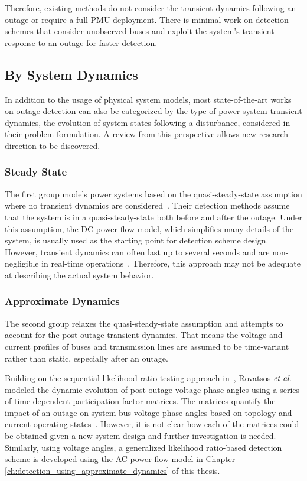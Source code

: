 Therefore, existing methods do not consider the transient dynamics following an outage or require a full PMU deployment. There is minimal work on detection schemes that consider unobserved buses and exploit the system's transient response to an outage for faster detection.

\subsection{By System Dynamics} %
\label{ssub:by_dynamics}

In addition to the usage of physical system models, most state-of-the-art works on outage detection can also be categorized by the type of power system transient dynamics, the evolution of system states following a disturbance, considered in their problem formulation. A review from this perspective allows new research direction to be discovered.

\subsubsection{Steady State}
The first group models power systems based on the quasi-steady-state assumption where no transient dynamics are considered~\cite{Tate2008, tate2009double, babakmehr2015application,Chen2016, ardakanian2017event,Ardakanian2019a}. Their detection methods assume that the system is in a quasi-steady-state both before and after the outage. Under this assumption, the DC power flow model, which simplifies many details of the system, is usually used as the starting point for detection scheme design. However, transient dynamics can often last up to several seconds and are non-negligible in real-time operations~\cite{Glover2012}. Therefore, this approach may not be adequate at describing the actual system behavior. 

\subsubsection{Approximate Dynamics}
The second group relaxes the quasi-steady-state assumption and attempts to account for the post-outage transient dynamics. That means the voltage and current profiles of buses and transmission lines are assumed to be time-variant rather than static, especially after an outage. 

Building on the sequential likelihood ratio testing approach in~\cite{Chen2016}, Rovatsos $\textit{et al}.$ modeled the dynamic evolution of post-outage voltage phase angles using a series of time-dependent participation factor matrices. The matrices quantify the impact of an outage on system bus voltage phase angles based on topology and current operating states~\cite{Rovatsos2017}. However, it is not clear how each of the matrices could be obtained given a new system design and further investigation is needed. Similarly, using voltage angles, a generalized likelihood ratio-based detection scheme is developed using the AC power flow model in Chapter \ref{ch:detection_using_approximate_dynamics} of this thesis. 

